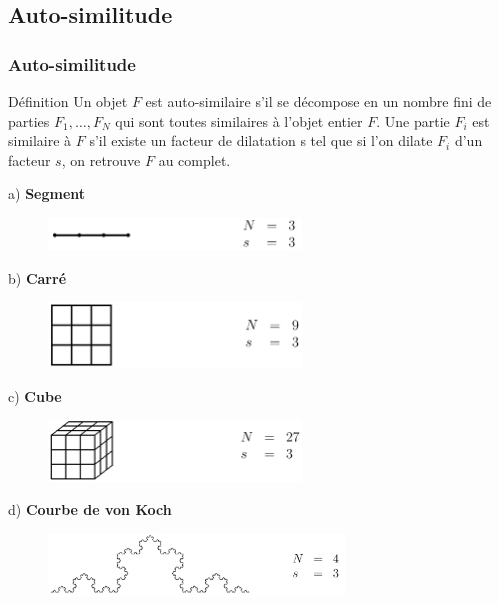 \documentclass[aspectratio=1610]{beamer}
\begin{document}
\subsection{Auto-similitude}
\begin{frame}
\frametitle{Auto-similitude}
\begin{block}{Définition}
    Un objet $F$ est auto-similaire s'il se décompose en un nombre fini de parties $F_1, \ldots , F_{N}$ qui sont toutes similaires à l'objet entier $F$. Une partie $F_{i}$ est similaire à $F$ s'il existe un facteur de dilatation s tel que si l'on dilate $F_{i}$ d'un facteur $s$, on retrouve $F$ au complet.
\end{block} 
\begin{description}
\begin{minipage}{0.5\textwidth}
    \item[a)] \textbf{Segment} 
      \begin{figure}[h]
          \includegraphics[width=0.6\textwidth,left]{IMG_1483}
          \label{fig:public1}
      \end{figure} 
 
    \item[b)] \textbf{Carré} 
    \begin{figure}[h]
        \includegraphics[width=0.6\textwidth,left]{IMG_1484}
        \label{fig:IMG_1484}
    \end{figure}    

\end{minipage}%
\begin{minipage}{0.5\textwidth}
    \item[c)] \textbf{Cube} 
    \begin{figure}[h]
        \includegraphics[width=0.6\textwidth,left]{IMG_1485}
        \label{fig:IMG_1483}
    \end{figure}    

    \item[d)] \textbf{Courbe de von Koch}
    \begin{figure}[h]
        \includegraphics[width=0.7\textwidth,left]{IMG_1486}
        \label{fig:IMG_1486}
    \end{figure} 

\end{minipage}
\end{description} 
\end{frame}
\end{document}
